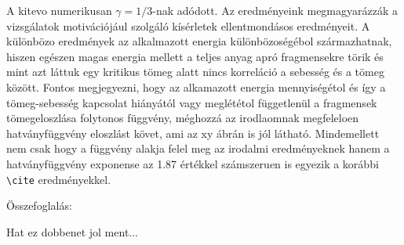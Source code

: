 A kitevo numerikusan $\gamma=1/3$-nak adódott. Az eredményeink megmagyarázzák a vizsgálatok motivációjául szolgáló kísérletek ellentmondásos eredményeit. A különbözo eredmények
az alkalmazott energia különbözoségébol származhatnak, hiszen egészen magas energia mellett a teljes anyag apró fragmensekre törik és mint azt láttuk egy kritikus tömeg alatt
nincs korreláció a sebesség és a tömeg között. Fontos megjegyezni, hogy az alkamazott energia mennyiségétol és így a tömeg-sebesség kapcsolat hiányától vagy meglététol függetlenül
a fragmensek tömegeloszlása folytonos függvény, méghozzá az irodlaomnak megfeleloen hatványfüggvény eloszlást követ, ami az xy ábrán is jól látható. Mindemellett nem csak
hogy a függvény alakja felel meg az irodalmi eredményeknek hanem a hatványfüggvény exponense az 1.87 értékkel számszeruen is egyezik a korábbi \verb=\cite= eredményekkel.


Összefoglalás:

Hat ez dobbenet jol ment...

